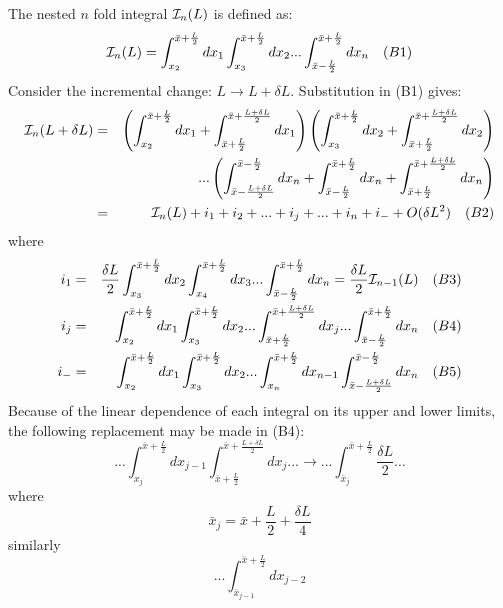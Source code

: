 \documentclass [12pt]{article}
\begin{document}
{  \par The nested $n$ fold integral ${\cal I}_n(L)$ is defined as:
 \[ {\cal I}_n(L) =  \int_{x_2}^{\bar{x} +\frac{L}{2}} d x_1  \int_{x_3}^{\bar{x} +\frac{L}{2}} d x_2
  ... \int_{\bar{x} -\frac{L}{2}}^{\bar{x} +\frac{L}{2}} dx_n~~~(B1) \]
  Consider the incremental change: $L \rightarrow L + \delta L$. Substitution in (B1) gives:
  \begin{eqnarray}
  {\cal I}_n(L+\delta L) & = & \left( \int_{x_2}^{\bar{x} +\frac{L}{2}}d x_1
    +  \int_{\bar{x} +\frac{L}{2}}^{\bar{x} +\frac{L+\delta L}{2}}d x_1 \right)
   \left( \int_{x_3}^{\bar{x} +\frac{L}{2}}d x_2
    +  \int_{\bar{x} +\frac{L}{2}}^{\bar{x} +\frac{L+\delta L}{2}}d x_2 \right)
 \nonumber \\
      &   & ...\left( \int_{\bar{x} -\frac{L+\delta L}{2}}^{\bar{x} -\frac{L}{2}}d x_n
      +  \int_{\bar{x} -\frac{L}{2}}^{\bar{x} +\frac{L}{2}}d x_n
    +  \int_{\bar{x} +\frac{L }{2}}^{\bar{x} +\frac{L+\delta L}{2}}d x_n \right) 
   \nonumber \\
    & = &   {\cal I}_n(L) +i_1 + i_2 +...+i_j+ ...+i_n + i_- +O(\delta L^2) \nonumber ~~~(B2)
 \end{eqnarray}
   where
  \begin{eqnarray}
  i_1 & = & \frac{\delta L}{2} \int_{x_3}^{\bar{x} +\frac{L}{2}} d x_2 
   \int_{x_4}^{\bar{x} +\frac{L}{2}} d x_3...
    \int_{\bar{x} -\frac{L}{2}}^{\bar{x} +\frac{L}{2}} dx_n
     = \frac{\delta L}{2}{\cal I}_{n-1}(L) \nonumber~~~(B3) \\ 
    i_j & = & \int_{x_2}^{\bar{x} +\frac{L}{2}} d x_1 
   \int_{x_3}^{\bar{x} +\frac{L}{2}} d x_2...
 \int_{\bar{x} +\frac{L}{2}}^{\bar{x} +\frac{L+\delta L}{2}} d x_j...
    \int_{\bar{x} -\frac{L}{2}}^{\bar{x} +\frac{L}{2}} dx_n \nonumber~~~(B4) \\
    i_- & = & \int_{x_2}^{\bar{x} +\frac{L}{2}} d x_1 
   \int_{x_3}^{\bar{x} +\frac{L}{2}} d x_2...
 \int_{x_n}^{\bar{x} +\frac{L}{2}} d x_{n-1}
    \int_{\bar{x} -\frac{L+\delta L}{2}}^{\bar{x} -\frac{L}{2}} dx_n \nonumber~~~(B5)
  \end{eqnarray}
  Because of the linear dependence of each integral on its upper and lower limits, the 
  following replacement may be made in (B4):
   \[... \int_{x_j}^{\bar{x} +\frac{L}{2}} d x_{j-1} 
   \int_{\bar{x} +\frac{L}{2}}^{\bar{x} +\frac{L+\delta L}{2}} d x_j...
    \rightarrow ... \int_{\bar{x}_j}^{\bar{x} +\frac{L}{2}} \frac{\delta L}{2}... \]
      where
     \[\bar{x}_j = \bar{x} +\frac{L}{2}+ \frac{\delta L}{4} \]
     similarly
 \[ ... \int_{\bar{x}_{j-1}}^{\bar{x} +\frac{L}{2}} d x_{j-2}
\]}
\end{document}
